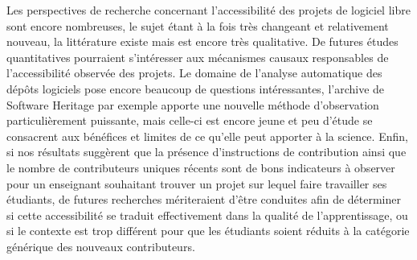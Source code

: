 \documentclass[dvipsnames,runningheads]{llncs}
\begin{document}
    Les perspectives de recherche concernant l'accessibilité des projets de logiciel libre sont encore
    nombreuses, le sujet étant à la fois très changeant et relativement nouveau, la littérature existe mais
    est encore très qualitative. De futures études quantitatives pourraient s'intéresser aux mécanismes
    causaux responsables de l'accessibilité observée des projets. Le domaine de l'analyse automatique des
    dépôts logiciels pose encore beaucoup de questions intéressantes, l'archive de Software Heritage par
    exemple apporte une nouvelle méthode d'observation particulièrement puissante, mais celle-ci est encore
    jeune et peu d'étude se consacrent aux bénéfices et limites de ce qu'elle peut apporter à la science.
    Enfin, si nos résultats suggèrent que la présence d'instructions de contribution ainsi que le nombre de
    contributeurs uniques récents sont de bons indicateurs à observer pour un enseignant souhaitant trouver un
    projet sur lequel faire travailler ses étudiants, de futures recherches mériteraient d'être conduites afin
    de déterminer si cette accessibilité se traduit effectivement dans la qualité de l'apprentissage, ou si le
    contexte est trop différent pour que les étudiants soient réduits à la catégorie générique des nouveaux
    contributeurs.

    \printbibliography[heading=bibintoc]
\end{document}
